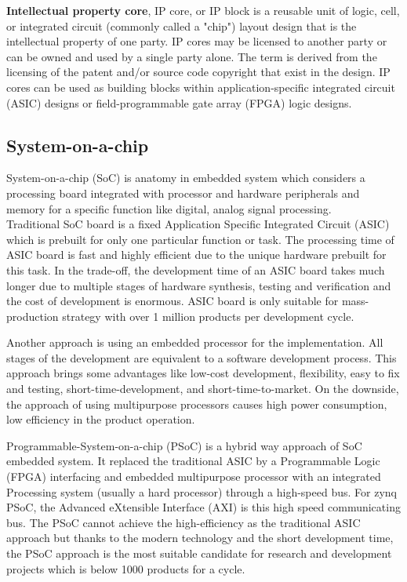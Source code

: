 \noindent \textbf{Intellectual property core}, IP core, or IP block is a reusable unit of logic, cell, or integrated circuit (commonly called a "chip") layout design that is the intellectual property of one party. IP cores may be licensed to another party or can be owned and used by a single party alone. The term is derived from the licensing of the patent and/or source code copyright that exist in the design. IP cores can be used as building blocks within application-specific integrated circuit (ASIC) designs or field-programmable gate array (FPGA) logic designs\cite{ipcore}.

\pagebreak 
\subsection{System-on-a-chip}

System-on-a-chip (SoC) is anatomy in embedded system which considers a processing board integrated with processor and hardware peripherals and memory for a specific function like digital, analog signal processing\cite{12457872420171101}. \\

\noindent Traditional SoC board is a fixed Application Specific Integrated Circuit (ASIC) which is prebuilt for only one particular function or task. The processing time of ASIC board is fast and highly efficient due to the unique hardware prebuilt for this task. In the trade-off, the development time of an ASIC board takes much longer due to multiple stages of hardware synthesis, testing and verification and the cost of development is enormous. ASIC board is only suitable for mass-production strategy with over 1 million products per development cycle. \\


\noindent Another approach is using an embedded processor for the implementation. All stages of the development are equivalent to a software development process. This approach brings some advantages like low-cost development, flexibility, easy to fix and testing, short-time-development, and short-time-to-market. On the downside, the approach of using multipurpose processors causes high power consumption, low efficiency in the product operation. \\


\noindent Programmable-System-on-a-chip (PSoC) is a hybrid way approach of SoC embedded system. It replaced the traditional ASIC by a Programmable Logic (FPGA) interfacing and embedded multipurpose processor with an integrated Processing system (usually a hard processor) through a high-speed bus. For zynq PSoC, the Advanced eXtensible Interface (AXI) is this high speed communicating bus. The PSoC cannot achieve the high-efficiency as the traditional ASIC approach but thanks to the modern technology and the short development time, the PSoC approach is the most suitable candidate for research and development projects which is below 1000 products for a cycle. \\

